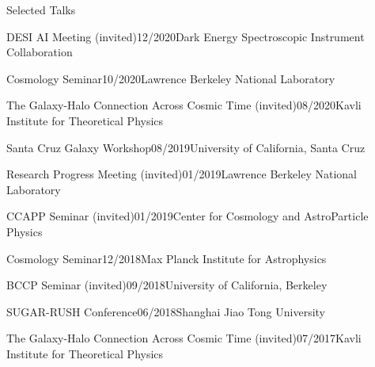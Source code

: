 \documentclass{resume}
\begin{document}
\begin{rSection}{Selected Talks}
  \begin{adjustwidth}{0.5cm}{}
  
    \begin{rSubsection}{DESI AI Meeting (invited)}{12/2020}{Dark Energy Spectroscopic Instrument Collaboration}{}\end{rSubsection}
  
    \begin{rSubsection}{Cosmology Seminar}{10/2020}{Lawrence Berkeley National Laboratory}{}\end{rSubsection}

    \begin{rSubsection}{The Galaxy-Halo Connection Across Cosmic Time (invited)}{08/2020}{Kavli Institute for Theoretical Physics}{}\end{rSubsection}

    \begin{rSubsection}{Santa Cruz Galaxy Workshop}{08/2019}{University of California, Santa Cruz}{}\end{rSubsection}

    \begin{rSubsection}{Research Progress Meeting (invited)}{01/2019}{Lawrence Berkeley National Laboratory}{}\end{rSubsection}

    \begin{rSubsection}{CCAPP Seminar (invited)}{01/2019}{Center for Cosmology and AstroParticle Physics}{}\end{rSubsection}

    \begin{rSubsection}{Cosmology Seminar}{12/2018}{Max Planck Institute for Astrophysics}{}\end{rSubsection}

    \begin{rSubsection}{BCCP Seminar (invited)}{09/2018}{University of California, Berkeley}{}\end{rSubsection}

    \begin{rSubsection}{SUGAR-RUSH Conference}{06/2018}{Shanghai Jiao Tong University}{}\end{rSubsection}

    \begin{rSubsection}{The Galaxy-Halo Connection Across Cosmic Time (invited)}{07/2017}{Kavli Institute for Theoretical Physics}{}\end{rSubsection}

  \end{adjustwidth}
\end{rSection}
\end{document}
